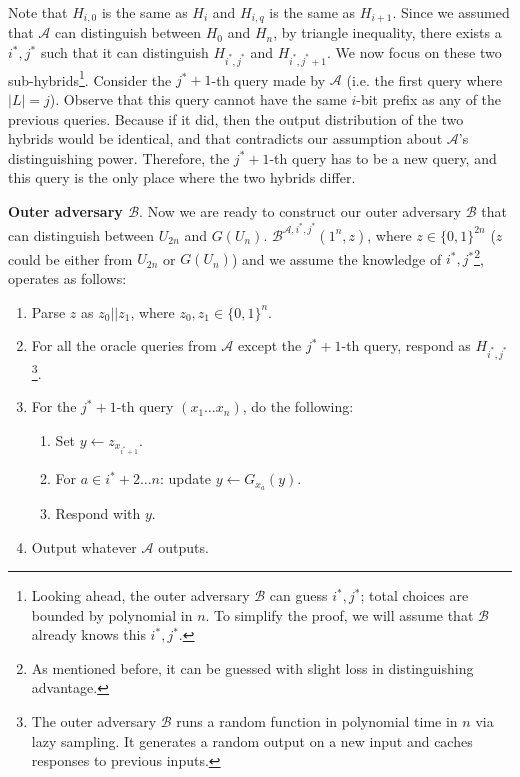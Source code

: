 Note that $H_{i, 0}$ is the same as $H_i$ and $H_{i, q}$ is the same as $H_{i+1}$. Since we assumed that $\mathcal{A}$ can distinguish between $H_0$ and $H_n$, by triangle inequality, there exists a $i^*, j^*$ such that it can distinguish $H_{i^*,j^*}$ and $H_{i^*,j^*+1}$. We now focus on these two sub-hybrids\footnote{Looking ahead, the outer adversary $\mathcal{B}$ can guess $i^*, j^*$; total choices are bounded by polynomial in $n$. To simplify the proof, we will assume that $\mathcal{B}$ already knows this $i^*, j^*$.}. Consider the $j^*+1$-th query made by $\mathcal{A}$ (i.e. the first query where $|L|=j$). Observe that this query cannot have the same $i$-bit prefix as any of the previous queries. Because if it did, then the output distribution of the two hybrids would be identical, and that contradicts our assumption about $\mathcal{A}$'s distinguishing power. Therefore, the $j^*+1$-th query has to be a new query, and this query is the only place where the two hybrids differ.\smallskip

\noindent \textbf{Outer adversary $\mathcal{B}$}. Now we are ready to construct our outer adversary $\mathcal{B}$ that can distinguish between $U_{2n}$ and $G(U_n)$. $\mathcal{B}^{\mathcal{A}, i^*, j^*}(1^n, z)$, where $z \in \{0, 1\}^{2n}$ ($z$ could be either from $U_{2n}$ or $G(U_n)$) and we assume the knowledge of $i^*, j^*$\footnote{As mentioned before, it can be guessed with slight loss in distinguishing advantage.}, operates as follows:
\begin{enumerate}
    \item Parse $z$ as $z_0||z_1$, where $z_0, z_1 \in \{0, 1\}^n$.
    \item For all the oracle queries from $\mathcal{A}$ except the $j^*+1$-th query, respond as $H_{i^*,j^*}$\footnote{The outer adversary $\mathcal{B}$ runs a random function in polynomial time in $n$ via lazy sampling. It generates a random output on a new input and caches responses to previous inputs.}.
    \item For the $j^*+1$-th query $(x_1\dots x_n)$, do the following:
          \begin{enumerate}
              \item Set $y \gets z_{x_{i^*+1}}$.
              \item For $a \in i^*+2 \dots n$: update $y \gets G_{x_a}(y)$.
              \item Respond with $y$.
          \end{enumerate}
    \item Output whatever $\mathcal{A}$ outputs.
\end{enumerate}

